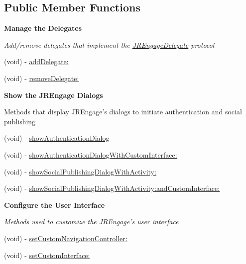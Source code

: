 \subsection*{Public Member Functions}
\begin{Indent}{\bf Manage the Delegates}\par
{\em \label{_amgrpf6bb425cb9b7388d33e37d551db6b02e}
 Add/remove delegates that implement the \hyperlink{protocol_j_r_engage_delegate-p}{JREngageDelegate} protocol }\begin{DoxyCompactItemize}
\item 
(void) -\/ \hyperlink{interface_j_r_engage_a18377ffb55f821587e6d38b3489692e8}{addDelegate:}
\item 
(void) -\/ \hyperlink{interface_j_r_engage_ab3f12ac148ea0f6df4d7ff7789cc7c94}{removeDelegate:}
\end{DoxyCompactItemize}
\end{Indent}
\begin{Indent}{\bf Show the JREngage Dialogs}\par
{\em \label{_amgrp345603279e1df04f4a3678e78089b7be}
 \label{interface_j_r_engage_showMethods}
\hypertarget{interface_j_r_engage_showMethods}{}


Methods that display JREngage's dialogs to initiate authentication and social publishing }\begin{DoxyCompactItemize}
\item 
(void) -\/ \hyperlink{interface_j_r_engage_a01ecdff491f91543e18f33d0e565b046}{showAuthenticationDialog}
\item 
(void) -\/ \hyperlink{interface_j_r_engage_ac8e1206be8608fbed548b7ec5f85e6e6}{showAuthenticationDialogWithCustomInterface:}
\item 
(void) -\/ \hyperlink{interface_j_r_engage_afca7b5ab9a57edc1a460aaec882207c4}{showSocialPublishingDialogWithActivity:}
\item 
(void) -\/ \hyperlink{interface_j_r_engage_af5c2aa40f5c45a22f369900d1bd81953}{showSocialPublishingDialogWithActivity:andCustomInterface:}
\end{DoxyCompactItemize}
\end{Indent}
\begin{Indent}{\bf Configure the User Interface}\par
{\em \label{_amgrp94e7ef441fcaa606cadd8cfd8b428e50}
 Methods used to customize the JREngage's user interface }\begin{DoxyCompactItemize}
\item 
(void) -\/ \hyperlink{interface_j_r_engage_a6c704bbff377d20603e6b52bd0ae17f1}{setCustomNavigationController:}
\item 
(void) -\/ \hyperlink{interface_j_r_engage_ab1757bbe9e83255b1b9128c630267fdf}{setCustomInterface:}
\end{DoxyCompactItemize}
\end{Indent}
